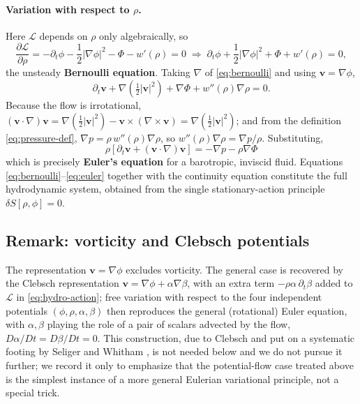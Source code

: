 \documentclass[11pt]{article}
\newcommand{\bv}{\mathbf{v}}
\begin{document}
\paragraph{Variation with respect to $\rho$.} Here $\mathcal L$ depends on $\rho$ only algebraically, so
\begin{equation}
\frac{\partial \mathcal L}{\partial \rho} = -\partial_t\phi - \frac12|\nabla\phi|^2 - \Phi - w'(\rho) = 0
\;\Longrightarrow\;
\partial_t \phi + \frac12|\nabla\phi|^2 + \Phi + w'(\rho) = 0, \label{eq:bernoulli}
\end{equation}
the unsteady \textbf{Bernoulli equation}. Taking $\nabla$ of \eqref{eq:bernoulli} and using $\bv=\nabla\phi$,
\begin{equation}
\partial_t \bv + \nabla\!\left(\tfrac12|\bv|^2\right) + \nabla\Phi + w''(\rho)\nabla\rho = 0.
\end{equation}
Because the flow is irrotational, $(\bv\cdot\nabla)\bv = \nabla(\tfrac12|\bv|^2) - \bv\times(\nabla\times\bv) = \nabla(\tfrac12|\bv|^2)$; and from the definition \eqref{eq:pressure-def}, $\nabla p = \rho\,w''(\rho)\nabla\rho$, so $w''(\rho)\nabla\rho = \nabla p/\rho$. Substituting,
\begin{equation}
\boxed{\;\rho\left[\partial_t \bv + (\bv\cdot\nabla)\bv\right] = -\nabla p - \rho\nabla\Phi\;} \label{eq:euler}
\end{equation}
which is precisely \textbf{Euler's equation} for a barotropic, inviscid fluid. Equations \eqref{eq:bernoulli}--\eqref{eq:euler} together with the continuity equation constitute the full hydrodynamic system, obtained from the single stationary-action principle $\delta S[\rho,\phi]=0$.

\subsection{Remark: vorticity and Clebsch potentials}

The representation $\bv=\nabla\phi$ excludes vorticity. The general case is recovered by the Clebsch representation $\bv = \nabla\phi + \alpha\nabla\beta$, with an extra term $-\rho\alpha\,\partial_t\beta$ added to $\mathcal{L}$ in \eqref{eq:hydro-action}; free variation with respect to the four independent potentials $(\phi,\rho,\alpha,\beta)$ then reproduces the general (rotational) Euler equation, with $\alpha,\beta$ playing the role of a pair of scalars advected by the flow, $D\alpha/Dt = D\beta/Dt = 0$. This construction, due to Clebsch \cite{Clebsch1859} and put on a systematic footing by Seliger and Whitham \cite{SeligerWhitham1968}, is not needed below and we do not pursue it further; we record it only to emphasize that the potential-flow case treated above is the simplest instance of a more general Eulerian variational principle, not a special trick.
\end{document}
